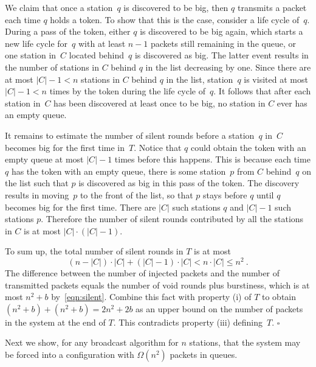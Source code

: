 \documentclass[11pt]{article}
\newcommand{\qed}{\hfill $\square$ \smallbreak}
\newenvironment{proof}{\noindent{\bf Proof:}}{\qed}
\begin{document}
\begin{proof}
We claim that once a station~$q$ is discovered to be big, then $q$ transmits a packet each time $q$ holds a token.
To show that this is the case, consider a life cycle of~$q$.
During a pass of the token, either $q$ is discovered to be big again, which starts a new life cycle for~$q$ with at least $n-1$ packets still remaining in the queue, or one station in~$C$ located behind~$q$ is discovered as big.
The latter event results in the number of stations in $C$ behind $q$ in the list decreasing by one.
Since there are at most $|C|-1 < n$ stations in $C$  behind $q$ in the list, station~$q$ is visited at most $|C|-1<n$ times by the token during the life cycle of~$q$.
It follows that after each station in~$C$ has been discovered at least once to be big, no station in $C$ ever has an empty queue.

It remains to estimate the number of silent rounds before a station~$q$ in~$C$ becomes big for the first time in~$T$.
Notice that $q$ could obtain the token with an empty queue at most $|C|-1$ times before this happens.
This is because each time $q$ has the token with an empty queue, there is some station~$p$ from $C$ behind~$q$ on the list such that $p$ is discovered as big in this pass of the token.
The discovery results in moving~$p$ to the front of the list, so that $p$ stays before $q$ until $q$ becomes big for the first time.
There are $|C|$ such stations $q$ and $|C|-1$ such stations $p$.
Therefore the number of silent rounds contributed by all the stations in $C$ is at most $|C|\cdot (|C|-1)$.

To sum up, the total number of silent rounds in $T$ is at most
\begin{equation}
\label{eqn:silent}
(n-|C|)\cdot |C|+(|C|-1)\cdot |C| < n\cdot |C| \le n^2\ .
\end{equation}
The difference between the number of injected packets and the number of transmitted packets equals the number of void rounds plus burstiness, which is at most $n^2+b$ by~\eqref{eqn:silent}.
Combine this fact with property (i) of $T$ to obtain $(n^2+b)+(n^2+b)=2n^2+2b$ as an upper bound on the number of packets in the system at the end of $T$.
This contradicts property (iii) defining~$T$.
\end{proof}

Next we show, for any broadcast algorithm for $n$ stations, that the system may be forced into a configuration with $\Omega(n^2)$ packets in queues.


\end{document}

